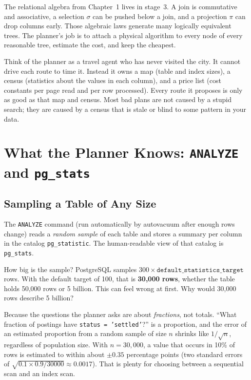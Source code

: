 The relational algebra from Chapter~1 lives in stage~3. A join is commutative and associative, a selection $\sigma$ can be pushed below a join, and a projection $\pi$ can drop columns early. Those algebraic laws generate many logically equivalent trees. The planner's job is to attach a physical algorithm to every node of every reasonable tree, estimate the cost, and keep the cheapest.

\begin{intuitionbox}
Think of the planner as a travel agent who has never visited the city. It cannot drive each route to time it. Instead it owns a map (table and index sizes), a census (statistics about the values in each column), and a price list (cost constants per page read and per row processed). Every route it proposes is only as good as that map and census. Most bad plans are not caused by a stupid search; they are caused by a census that is stale or blind to some pattern in your data.
\end{intuitionbox}

\section{What the Planner Knows: \texttt{ANALYZE} and \texttt{pg\_stats}}
\label{ch07:statistics}

\subsection{Sampling a Table of Any Size}

The \texttt{ANALYZE} command (run automatically by autovacuum after enough rows change) reads a \emph{random sample} of each table and stores a summary per column in the catalog \texttt{pg\_statistic}. The human-readable view of that catalog is \texttt{pg\_stats}.

How big is the sample? PostgreSQL samples $300 \times \texttt{default\_statistics\_target}$ rows. With the default target of 100, that is \textbf{30,000 rows}, whether the table holds 50,000 rows or 5 billion. This can feel wrong at first. Why would 30,000 rows describe 5 billion?

Because the questions the planner asks are about \emph{fractions}, not totals. ``What fraction of postings have \texttt{status = 'settled'}?'' is a proportion, and the error of an estimated proportion from a random sample of size $n$ shrinks like $1/\sqrt{n}$, regardless of population size. With $n = 30{,}000$, a value that occurs in 10\% of rows is estimated to within about $\pm 0.35$ percentage points (two standard errors of $\sqrt{0.1 \times 0.9 / 30000} \approx 0.0017$). That is plenty for choosing between a sequential scan and an index scan.

